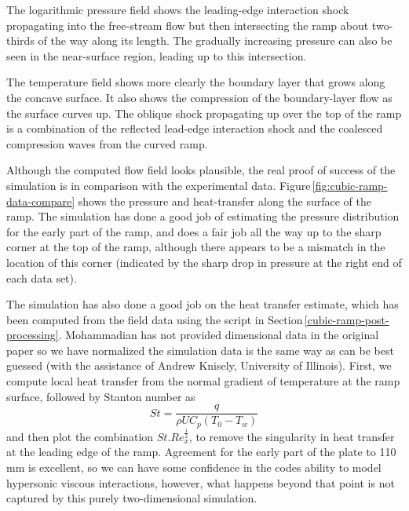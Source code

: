 \medskip
The logarithmic pressure field shows the leading-edge interaction shock propagating into the free-stream
flow but then intersecting the ramp about two-thirds of the way along its length.
The gradually increasing pressure can also be seen in the near-surface region, leading up to this intersection.

\medskip
The temperature field shows more clearly the boundary layer that grows along the concave surface.
It also shows the compression of the boundary-layer flow as the surface curves up.
The oblique shock propagating up over the top of the ramp is a combination of the reflected lead-edge
interaction shock and the coalesced compression waves from the curved ramp.

\clearpage

\medskip
Although the computed flow field looks plausible,
the real proof of success of the simulation is in comparison with the experimental data.
Figure\,\ref{fig:cubic-ramp-data-compare} shows the pressure and heat-transfer
along the surface of the ramp.
The simulation has done a good job of estimating the pressure distribution for the early part of the ramp,
and does a fair job all the way up to the sharp corner at the top of the ramp,
although there appears to be a mismatch in the location of this corner 
(indicated by the sharp drop in pressure at the right end of each data set).

\medskip
The simulation has also done a good job on the heat transfer estimate,
which has been computed from the field data using the script in Section\,\ref{cubic-ramp-post-processing}.
Mohammadian has not provided dimensional data in the original paper so we have normalized the simulation
data is the same way as can be best guessed (with the assistance of Andrew Knisely, University of Illinois).
First, we compute local heat transfer from the normal gradient of temperature at the ramp surface,
followed by Stanton number as
$$
St = \frac{q}{\rho U C_p (T_0 - T_w)}
$$
and then plot the combination $St . Re_x^{\frac{1}{2}}$, to remove the singularity in heat transfer
at the leading edge of the ramp.
Agreement for the early part of the plate to 110\,mm is excellent, so we can have some 
confidence in the codes ability to model hypersonic viscous interactions, however,
what happens beyond that point is not captured by this purely two-dimensional simulation.

